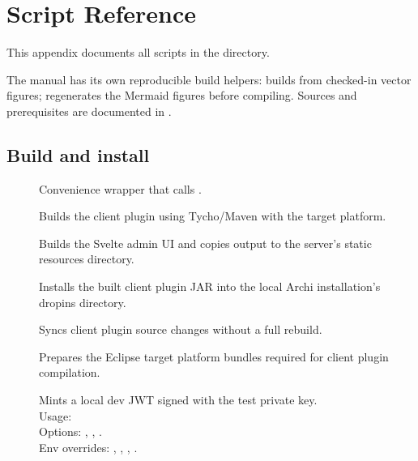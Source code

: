 \section{Script Reference}
\label{sec:AppendixScripts}

This appendix documents all scripts in the  directory.

The manual has its own reproducible build helpers:
 builds from checked-in vector figures;
 regenerates the Mermaid
figures before compiling. Sources and prerequisites are documented in
.

\subsection{Build and install}

\begin{description}
\item[]
  Convenience wrapper that calls .

\item[]
  Builds the client plugin using Tycho/Maven with the target platform.

\item[]
  Builds the Svelte admin UI and copies output to the server's static
  resources directory.

\item[]
  Installs the built client plugin JAR into the local Archi installation's
  dropins directory.

\item[]
  Syncs client plugin source changes without a full rebuild.

\item[]
  Prepares the Eclipse target platform bundles required for client plugin
  compilation.

\item[]
  Mints a local dev JWT signed with the test private key.\\
  Usage: \\
  Options: , ,
  .\\
  Env overrides: , ,
  , .
\end{description}

